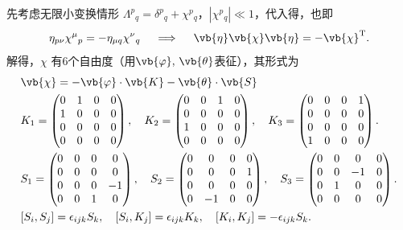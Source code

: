 先考虑无限小变换情形 \(\Lambda^p{}_q = \delta^p{}_q + \chi^p{}_q\)，\(|\chi^p{}_q| \ll 1\)，代入得，也即
\begin{equation*}
	\eta_{p\nu} \chi^\mu{}_p = -\eta_{\mu q} \chi^\nu{}_q \quad\implies\quad\vb{\eta} \vb{\chi} \vb{\eta} = -\vb{\chi}^\mathrm{T}.
\end{equation*}
解得，\(\chi\) 有6个自由度（用\(\vb{\varphi},\,\vb{\theta}\)表征），其形式为
\begin{align*}
	 & \vb{\chi} = -\vb{\varphi} \cdot \vb{K} - \vb{\theta} \cdot \vb{S}                                               \\
	 & K_1 = \begin{pmatrix}
		         0 & 1 & 0 & 0 \\
		         1 & 0 & 0 & 0 \\
		         0 & 0 & 0 & 0 \\
		         0 & 0 & 0 & 0
	         \end{pmatrix}, \quad
	K_2 = \begin{pmatrix}
		      0 & 0 & 1 & 0 \\
		      0 & 0 & 0 & 0 \\
		      1 & 0 & 0 & 0 \\
		      0 & 0 & 0 & 0
	      \end{pmatrix}, \quad
	K_3 = \begin{pmatrix}
		      0 & 0 & 0 & 1 \\
		      0 & 0 & 0 & 0 \\
		      0 & 0 & 0 & 0 \\
		      1 & 0 & 0 & 0
	      \end{pmatrix}.                                                                                               \\
	 & S_1 = \begin{pmatrix}
		         0 & 0 & 0 & 0  \\
		         0 & 0 & 0 & 0  \\
		         0 & 0 & 0 & -1 \\
		         0 & 0 & 1 & 0
	         \end{pmatrix}, \quad
	S_2 = \begin{pmatrix}
		      0 & 0  & 0 & 0 \\
		      0 & 0  & 0 & 1 \\
		      0 & 0  & 0 & 0 \\
		      0 & -1 & 0 & 0
	      \end{pmatrix}, \quad
	S_3 = \begin{pmatrix}
		      0 & 0 & 0  & 0 \\
		      0 & 0 & -1 & 0 \\
		      0 & 1 & 0  & 0 \\
		      0 & 0 & 0  & 0
	      \end{pmatrix}.                                                                                               \\
	 & [S_i, S_j] = \epsilon_{ijk} S_k, \quad [S_i, K_j] = \epsilon_{ijk} K_k, \quad [K_i, K_j] = -\epsilon_{ijk} S_k.
\end{align*}

